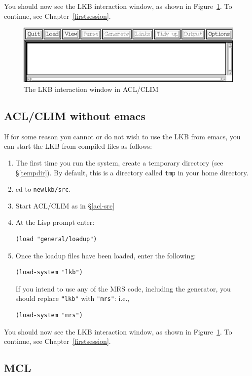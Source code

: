 \documentclass[12pt]{report}
\newcommand{\filename}[1]{{\tt #1}}
\begin{document}
You
should now see the LKB interaction window, as shown in 
Figure~\ref{lkbtop-unix}.
To continue, see Chapter~\ref{firstsession}.
\begin{figure}
\includegraphics[width=400bp]{figs/lkbtop-unix}
\caption{The LKB interaction window in ACL/CLIM}
\label{lkbtop-unix}
\end{figure}

\subsection{ACL/CLIM without emacs}
\label{acl-comp}

If for some reason you cannot or do not wish to use
the LKB from emacs, you can start the LKB from compiled files as follows:
\begin{enumerate}
\item The first time you run the system,
create a temporary directory (see \S\ref{tempdir}).  By default, this is
a directory called \filename{tmp} in your home directory.
\item cd to \filename{newlkb/src}.  
\item Start ACL/CLIM as in \S\ref{acl-src}
\item At the Lisp prompt enter:
\begin{verbatim}
(load "general/loadup") 
\end{verbatim}
\item Once the loadup files have been loaded, enter the following:
\begin{verbatim}
(load-system "lkb")
\end{verbatim}
If you intend to use any of the MRS code, including the generator,
you should replace \verb+"lkb"+ with \verb+"mrs"+: i.e.,
\begin{verbatim}
(load-system "mrs")
\end{verbatim}
\end{enumerate}
You
should now see the LKB interaction window, as shown in 
Figure~\ref{lkbtop-unix}.
To continue, see Chapter~\ref{firstsession}.

\subsection{MCL}
\label{mcl-comp}
\end{document}
